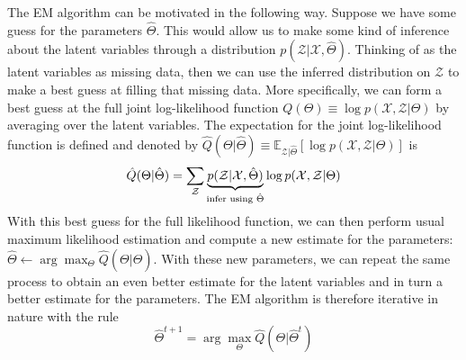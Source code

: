 \documentclass[onecolumn]{gwclass}
\begin{document}
	The EM algorithm can be motivated in the following way. Suppose we have some guess for the parameters $\hat\Theta$. This would allow us to make some kind of inference about the latent variables through a distribution $p(\mathcal{Z}|\mathcal{X},\hat\Theta)$. Thinking of as the latent variables as missing data, then we can use the inferred distribution on $\mathcal{Z}$ to make a best guess at filling that missing data. More specifically, we can form a best guess at the full joint log-likelihood function $Q(\Theta)\equiv \log p(\mathcal{X},\mathcal{Z}|\Theta)$ by averaging over the latent variables. The expectation for the joint log-likelihood function is defined and denoted by $\hat Q(\Theta|\hat\Theta) \equiv \mathbb{E}_{\mathcal{Z}|\hat\Theta}\left[ \log p(\mathcal{X},\mathcal{Z} |\Theta) \right]$ is
	$$ \hat Q(\Theta|\hat\Theta) = \sum_{\mathcal{Z}} \underbrace{p(\mathcal{Z}|\mathcal{X},\hat\Theta)}_{\text{\normalfont{infer using $\hat\Theta$}}} \log p(\mathcal{X},\mathcal{Z}|\Theta) $$
	With this best guess for the full likelihood function, we can then perform usual maximum likelihood estimation and compute a new estimate for the parameters: $ \hat\Theta \leftarrow \arg\max_\Theta \hat Q(\Theta|\hat\Theta)$. With these new parameters, we can repeat the same process to obtain an even better estimate for the latent variables and in turn a better estimate for the parameters. The EM algorithm is therefore iterative in nature with the rule
		$$ \hat\Theta^{t+1} = \arg\max_\Theta \hat Q(\Theta|\hat\Theta^t)$$


	
\end{document}
